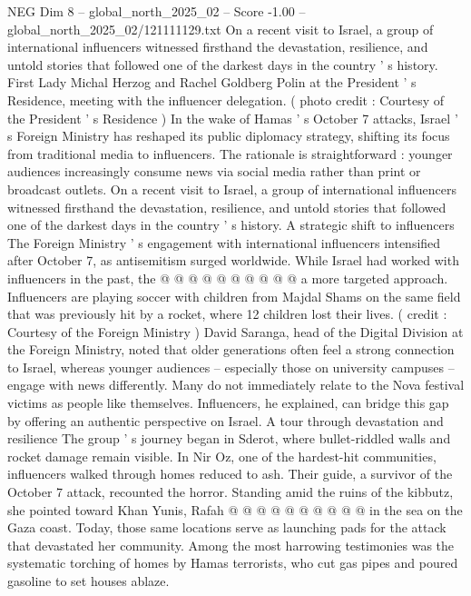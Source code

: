 \begin{textsample}{NEG Dim 8 – global\_north\_2025\_02 – Score -1.00 – global\_north\_2025\_02/121111129.txt}  \label{ex:f8_neg_428}
On a recent visit to Israel, a group of international influencers witnessed firsthand the devastation, resilience, and untold stories that followed one of the darkest days in the country ' s history.
First Lady Michal Herzog and Rachel Goldberg Polin at the President ' s Residence, meeting with the influencer delegation. ( photo credit : Courtesy of the President ' s Residence ) In the wake of Hamas ' s October 7 attacks, Israel ' s Foreign Ministry has reshaped its public diplomacy strategy, shifting its focus from traditional media to influencers.
The rationale is straightforward : younger audiences increasingly consume news via social media rather than print or broadcast outlets.
On a recent visit to Israel, a group of international influencers witnessed firsthand the devastation, resilience, and untold stories that followed one of the darkest days in the country ' s history.
A strategic shift to influencers The Foreign Ministry ' s engagement with international influencers intensified after October 7, as antisemitism surged worldwide.
While Israel had worked with influencers in the past, the @ @ @ @ @ @ @ @ @ @ a more targeted approach.
Influencers are playing soccer with children from Majdal Shams on the same field that was previously hit by a rocket, where 12 children lost their lives. ( credit : Courtesy of the Foreign Ministry ) David Saranga, head of the Digital Division at the Foreign Ministry, noted that older generations often feel a strong connection to Israel, whereas younger audiences -- especially those on university campuses -- engage with news differently.
Many do not immediately relate to the Nova festival victims as people like themselves.
Influencers, he explained, can bridge this gap by offering an authentic perspective on Israel.
A tour through devastation and resilience The group ' s journey began in Sderot, where bullet-riddled walls and rocket damage remain visible.
In Nir Oz, one of the hardest-hit communities, influencers walked through homes reduced to ash.
Their guide, a survivor of the October 7 attack, recounted the horror.
Standing amid the ruins of the kibbutz, she pointed toward Khan Yunis, Rafah @ @ @ @ @ @ @ @ @ @ in the sea on the Gaza coast.
Today, those same locations serve as launching pads for the attack that devastated her community.
Among the most harrowing testimonies was the systematic torching of homes by Hamas terrorists, who cut gas pipes and poured gasoline to set houses ablaze.

\end{textsample}
